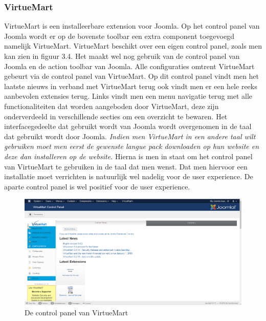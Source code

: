 \subsubsection{VirtueMart}
VirtueMart is een installeerbare extension voor Joomla. Op het control panel van Joomla wordt er op de bovenste toolbar een extra component toegevoegd namelijk VirtueMart. VirtueMart beschikt over een eigen control panel, zoals men kan zien in figuur 3.4. Het maakt wel nog gebruik van de control panel van Joomla en de action toolbar van Joomla. Alle configuraties omtrent VirtueMart gebeurt via de control panel van VirtueMart. Op dit control panel vindt men het laatste nieuws in verband met VirtueMart terug ook vindt men er een hele reeks aanbevolen extensies terug. Links vindt men een menu navigatie terug met alle functionaliteiten dat worden aangeboden door VirtueMart, deze zijn onderverdeeld in verschillende secties om een overzicht te bewaren. Het interfacegedeelte dat gebruikt wordt van Joomla wordt overgenomen in de taal dat gebruikt wordt door Joomla. \textit{Indien men VirtueMart in een andere taal wilt gebruiken moet men eerst de gewenste langue pack downloaden op hun website en deze dan installeren op de website.} \autocite{VirtueMart2019} Hierna is men in staat om het control panel van VirtueMart te gebruiken in de taal dat men wenst. Dat men hiervoor een installatie moet verrichten is natuurlijk wel nadelig voor de user experience. De aparte control panel is wel positief voor de user experience.
\begin{figure}
	\centering
	\includegraphics[scale = 0.3]{img/virtuemart_controlpanel.png}
	\caption{De control panel van VirtueMart}
	\label{fig:VMcontrolpanel}
\end{figure}
